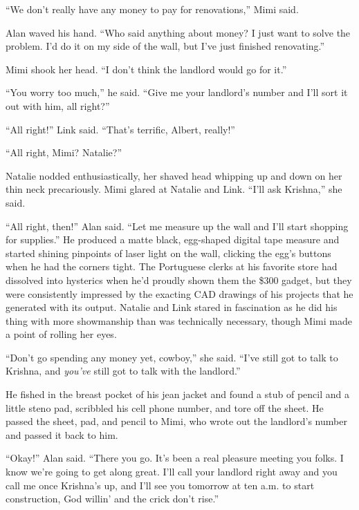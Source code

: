 ``We don't really have any money to pay for renovations,'' Mimi said.

Alan waved his hand.  ``Who said anything about money?  I just want to
solve the problem.  I'd do it on my side of the wall, but I've just
finished renovating.''

Mimi shook her head.  ``I don't think the landlord would go for it.''

``You worry too much,'' he said.  ``Give me your landlord's number and
I'll sort it out with him, all right?''

``All right!'' Link said.  ``That's terrific, Albert, really!''

``All right, Mimi?  Natalie?''

Natalie nodded enthusiastically, her shaved head whipping up and down
on her thin neck precariously.  Mimi glared at Natalie and Link. 
``I'll ask Krishna,'' she said.

``All right, then!'' Alan said.  ``Let me measure up the wall and I'll
start shopping for supplies.'' He produced a matte black, egg-shaped
digital tape measure and started shining pinpoints of laser light on
the wall, clicking the egg's buttons when he had the corners tight. 
The Portuguese clerks at his favorite store had dissolved into
hysterics when he'd proudly shown them the \$300 gadget, but they were
consistently impressed by the exacting CAD drawings of his projects
that he generated with its output.  Natalie and Link stared in
fascination as he did his thing with more showmanship than was
technically necessary, though Mimi made a point of rolling her eyes.

``Don't go spending any money yet, cowboy,'' she said.  ``I've still
got to talk to Krishna, and \textit{you've} still got to talk with the
landlord.''

He fished in the breast pocket of his jean jacket and found a stub of
pencil and a little steno pad, scribbled his cell phone number, and
tore off the sheet.  He passed the sheet, pad, and pencil to Mimi, who
wrote out the landlord's number and passed it back to him.

``Okay!'' Alan said.  ``There you go.  It's been a real pleasure
meeting you folks.  I know we're going to get along great.  I'll call
your landlord right away and you call me once Krishna's up, and I'll
see you tomorrow at ten a.m.  to start construction, God willin' and
the crick don't rise.''

